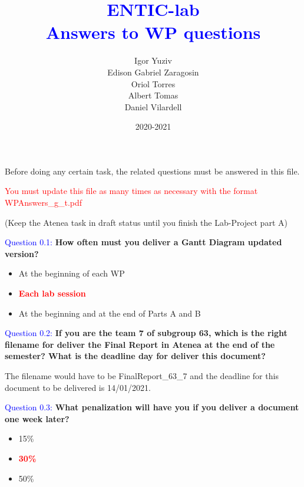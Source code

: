 \documentclass[12pt, a4papre]{article}
\author{	
		Igor Yuziv\\
		Edison Gabriel Zaragosin\\
		Oriol Torres\\
		Albert Tomas\\
		Daniel Vilardell}
\title{\textbf{\textcolor{blue}{ENTIC-lab\\
	Answers to WP questions}}}
\date{2020-2021}
\begin{document}
	
	\maketitle
	\tableofcontents
	\newpage
	\begin{center}
	\footnotesize{
		Before doing any certain task, the related questions must be answered in this file.
		
		\textcolor{red}{You must update this file as many times as necessary with the format WPAnswers\_g\_t.pdf}
		
 		(Keep the Atenea task in draft status until you finish the Lab-Project part A)
		}
	\end{center}

	\textcolor{blue}{Question 0.1:} \textbf{How often must you deliver a Gantt Diagram updated version?}
	\begin{itemize}
		\item At the beginning of each WP
		\item \textcolor{red}{ \textbf{Each lab session}}
		\item At the beginning and at the end of Parts A and B
	\end{itemize}
	
	\textcolor{blue}{Question 0.2:} \textbf{If you are the team 7 of subgroup 63, which is the right filename for deliver the Final Report in Atenea at the end of the semester? What is the deadline day for deliver this document?}
	
	The filename would have to be FinalReport\_63\_7 and the deadline for this document to be delivered is 14/01/2021.
	
	\textcolor{blue}{Question 0.3:} \textbf{What penalization will have you if you deliver a document one week later?}
	\begin{itemize}
		\item 15\%
		\item \textcolor{red}{ \textbf{30\%}}
		\item 50\%
	\end{itemize}
	
\end{document}
